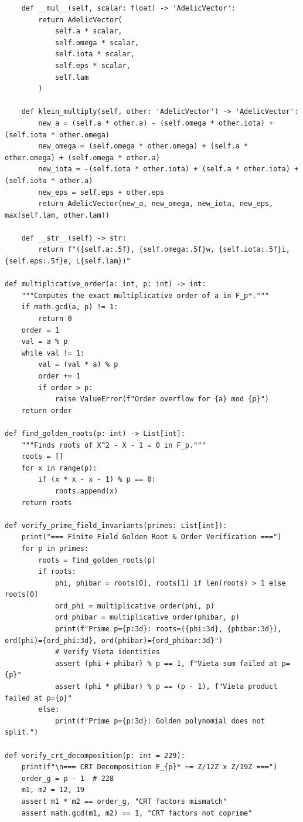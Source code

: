 \begin{verbatim}
    def __mul__(self, scalar: float) -> 'AdelicVector':
        return AdelicVector(
            self.a * scalar,
            self.omega * scalar,
            self.iota * scalar,
            self.eps * scalar,
            self.lam
        )

    def klein_multiply(self, other: 'AdelicVector') -> 'AdelicVector':
        new_a = (self.a * other.a) - (self.omega * other.iota) + (self.iota * other.omega)
        new_omega = (self.omega * other.omega) + (self.a * other.omega) + (self.omega * other.a)
        new_iota = -(self.iota * other.iota) + (self.a * other.iota) + (self.iota * other.a)
        new_eps = self.eps + other.eps
        return AdelicVector(new_a, new_omega, new_iota, new_eps, max(self.lam, other.lam))

    def __str__(self) -> str:
        return f"({self.a:.5f}, {self.omega:.5f}w, {self.iota:.5f}i, {self.eps:.5f}e, L{self.lam})"

def multiplicative_order(a: int, p: int) -> int:
    """Computes the exact multiplicative order of a in F_p*."""
    if math.gcd(a, p) != 1:
        return 0
    order = 1
    val = a % p
    while val != 1:
        val = (val * a) % p
        order += 1
        if order > p:
            raise ValueError(f"Order overflow for {a} mod {p}")
    return order

def find_golden_roots(p: int) -> List[int]:
    """Finds roots of X^2 - X - 1 = 0 in F_p."""
    roots = []
    for x in range(p):
        if (x * x - x - 1) % p == 0:
            roots.append(x)
    return roots

def verify_prime_field_invariants(primes: List[int]):
    print("=== Finite Field Golden Root & Order Verification ===")
    for p in primes:
        roots = find_golden_roots(p)
        if roots:
            phi, phibar = roots[0], roots[1] if len(roots) > 1 else roots[0]
            ord_phi = multiplicative_order(phi, p)
            ord_phibar = multiplicative_order(phibar, p)
            print(f"Prime p={p:3d}: roots=({phi:3d}, {phibar:3d}), ord(phi)={ord_phi:3d}, ord(phibar)={ord_phibar:3d}")
            # Verify Vieta identities
            assert (phi + phibar) % p == 1, f"Vieta sum failed at p={p}"
            assert (phi * phibar) % p == (p - 1), f"Vieta product failed at p={p}"
        else:
            print(f"Prime p={p:3d}: Golden polynomial does not split.")

def verify_crt_decomposition(p: int = 229):
    print(f"\n=== CRT Decomposition F_{p}* ~= Z/12Z x Z/19Z ===")
    order_g = p - 1  # 228
    m1, m2 = 12, 19
    assert m1 * m2 == order_g, "CRT factors mismatch"
    assert math.gcd(m1, m2) == 1, "CRT factors not coprime"
    

\end{verbatim}
